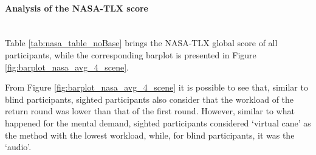 \FloatBarrier



\paragraph{Analysis of the NASA-TLX score}\mbox{}\\

Table \ref{tab:nasa_table_noBase} brings the NASA-TLX global score of all participants, while the corresponding barplot is presented in Figure \ref{fig:barplot_nasa_avg_4_scene}.



From Figure \ref{fig:barplot_nasa_avg_4_scene} it is possible to see that, similar to blind participants, sighted participants also consider that the workload of the return round was lower than that of the first round. However, similar to what happened for the mental demand, sighted participants considered ‘virtual cane’ as the method with the lowest workload, while, for  blind participants, it was the ‘audio’.


